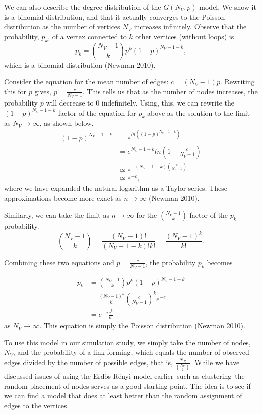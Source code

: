 \documentclass[12pt,twoside]{amherstthesis}
\begin{document}
  We can also describe the degree distribution of the \(G(N_V, p)\) model.
  We show it is a binomial distribution, and that it actually converges to
  the Poisson distribution as the number of vertices \(N_{V}\) increases
  infinitely. Observe that the probability, \(p_k\), of a vertex connected
  to \(k\) other vertices (without loops) is
  \[p_{k} = {N_{V} -1 \choose k}p^{k}(1 - p)^{N_{V} - 1 - k},\] which is a
  binomial distribution (Newman 2010).
  
  Consider the equation for the mean number of edges:
  \(c = (N_{V} - 1)p\). Rewriting this for \(p\) gives,
  \(p = \frac {c} {N_{V} - 1}\). This tells us that as the number of nodes
  increases, the probability \(p\) will decrease to \(0\) indefinitely.
  Using, this, we can rewrite the \((1 - p)^{N_{V} - 1 - k}\) factor of
  the equation for \(p_{k}\) above as the solution to the limit as
  \(N_{V} \to \infty\), as shown below. \[
  \begin{aligned}
  (1 - p)^{N_{V} - 1 - k} &= e^{ln((1 - p)^{N_{V} - 1 - k})} \\
  &= e^{N_{V} - 1 - k}ln(1 - \frac {c} {N_{V} - 1}) \\
  &\simeq e^{-(N_{V} - 1 - k)(\frac {c} {N_{V} - 1})} \\
  &\simeq e^{-c},
  \end{aligned}
  \] where we have expanded the natural logarithm as a Taylor series.
  These approximations become more exact as \(n \to \infty\) (Newman
  2010).
  
  Similarly, we can take the limit as \(n \to \infty\) for the
  \({N_{V} - 1 \choose k}\) factor of the \(p_k\) probability.
  \[{N_{V} - 1 \choose k} = \frac {(N_{V} - 1)!} {(N_{V} - 1 - k)!k!} = \frac {(N_{V} - 1)^{k}} {k!}.\]
  
  Combining these two equations and \(p = \frac {c} {N_{V} - 1}\), the
  probability \(p_{k}\) becomes
  
  \[
  \begin{aligned}
  p_{k} &= {N_{V} -1 \choose k}p^{k}(1 - p)^{N_{V} - 1 - k} \\
  &= \frac {(N_{V} - 1)^{k}} {k!}\left(\frac {c} {N_{V} - 1}\right)^{k}e^{-c} \\
  &= e^{-c} \frac{c^{k}} {k!}
  \end{aligned}
  \] as \(N_{V} \to \infty\). This equation is simply the Poisson
  distribution (Newman 2010).
  
  To use this model in our simulation study, we simply take the number of
  nodes, \(N_{V}\), and the probability of a link forming, which equals
  the number of observed edges divided by the number of possible edges,
  that is, \(\frac{N_{E}} {{N_{V} \choose 2}}\). While we have discussed
  issues of using the Erdős-Rényi model earlier--such as clustering--the
  random placement of nodes serves as a good starting point. The idea is
  to see if we can find a model that does at least better than the random
  assignment of edges to the vertices.
  
\end{document}
